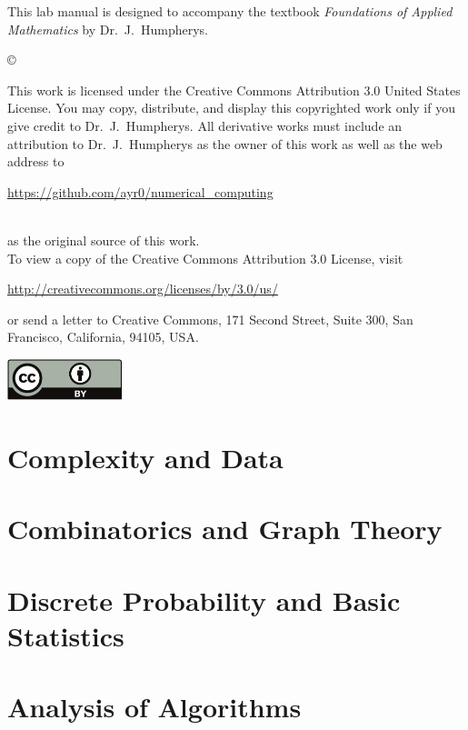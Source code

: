\documentclass{newsiambook}
\begin{document}

\begin{thepreface}
This lab manual is designed to accompany the textbook \emph{Foundations of Applied Mathematics} by Dr.~J.~Humpherys.

\vfill
\copyright{This work is licensed under the Creative Commons Attribution 3.0 United States 
License.  You may copy, distribute, and display this copyrighted work only if you give 
credit to Dr.~J.~Humpherys. All derivative works must include an attribution to Dr.~J.~Humpherys as the owner of this work as well as the web address to 
\\\centerline{\url{https://github.com/ayr0/numerical_computing}}\\ as the original source of 
this 
work.\\To view a copy of the Creative Commons Attribution 3.0 License, 
visit\\\centerline{\url{http://creativecommons.org/licenses/by/3.0/us/}} or send a letter to 
Creative Commons, 171 Second Street, Suite 300, San Francisco, California, 94105, USA.}

\vfill
\centering\includegraphics[height=1.2cm]{by}
\vfill
\end{thepreface}

\setcounter{tocdepth}{1}
\tableofcontents

\mainmatter

\part{Complexity and Data}

\part{Combinatorics and Graph Theory}

\part{Discrete Probability and Basic Statistics}

\part{Analysis of Algorithms}
\end{document}

